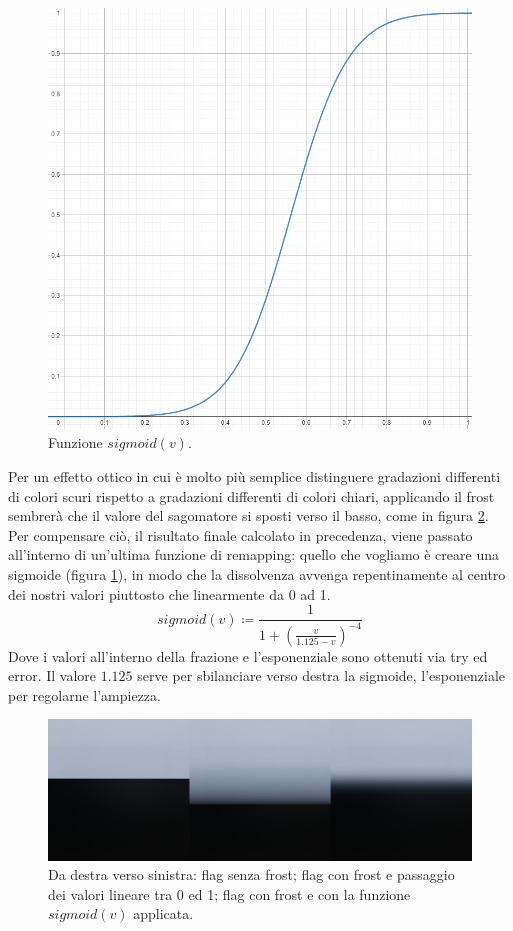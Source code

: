 \documentclass[main.tex]{subfiles}
\begin{document}
\begin{figure}
    \centering
    \captionsetup{justification=centering}
    \includegraphics[scale=0.35]{img/newFeatures/sCurve.png}
    \caption{Funzione $sigmoid(v)$.}
    \label{fig:5_sCurve}
\end{figure}
Per un effetto ottico in cui è molto più semplice distinguere gradazioni differenti di colori scuri rispetto a gradazioni differenti di colori chiari, applicando il frost sembrerà che il valore del sagomatore si sposti verso il basso, come in figura \ref{fig:5_shaperFixes}. Per compensare ciò, il risultato finale calcolato in precedenza, viene passato all'interno di un'ultima funzione di remapping: quello che vogliamo è creare una sigmoide (figura \ref{fig:5_sCurve}), in modo che la dissolvenza avvenga repentinamente al centro dei nostri valori piuttosto che linearmente da 0 ad 1.
\[sigmoid(v) \coloneqq \frac{1}{1 + (\frac{v}{1.125 - v})^{-4}}\]
Dove i valori all'interno della frazione e l'esponenziale sono ottenuti via try ed error. Il valore $1.125$ serve per sbilanciare verso destra la sigmoide, l'esponenziale per regolarne l'ampiezza.
\begin{figure}[H]
    \centering
    \includegraphics[width=1\linewidth]{img/newFeatures/shaperFixes.jpg}
    \caption{Da destra verso sinistra: flag senza frost; flag con frost e passaggio dei valori lineare tra 0 ed 1; flag con frost e con la funzione $sigmoid(v)$ applicata.}
    \label{fig:5_shaperFixes}
\end{figure}
\end{document}
